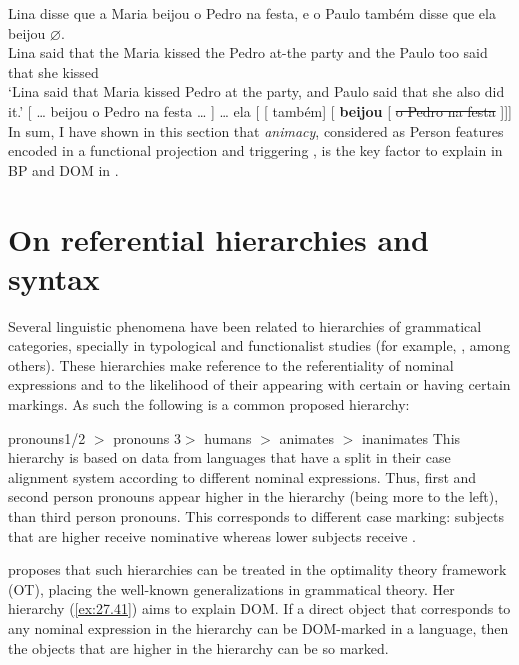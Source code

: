 \documentclass[output=paper]{langsci/langscibook}
\begin{document}
\ea\label{ex:27.39} 
    \ea
        \gll    Lina disse  que   a   Maria beijou   o Pedro na festa, e o Paulo também disse que ela  beijou \textbf{$\varnothing$}.\\
                Lina said    that the Maria kissed   the   Pedro   at-the   party and  the Paulo too       said   that  she kissed\\
        \glt    `Lina said that Maria kissed Pedro at the party, and Paulo said that she also did it.'
    \ex
        {}[ \dots{} beijou o Pedro na festa \dots{} ] \dots{} ela [ [ também] [\textbf{} \textbf{beijou} [ \sout{o Pedro na festa} ]]]\\
    \z
\z
In sum, I have shown in this section that \emph{animacy}, considered as Person
features encoded in a functional projection and triggering , is the key
factor to explain  in \gls{BP} and
DOM in .

\section{On referential hierarchies and syntax}\label{sec:27.4}

Several linguistic phenomena have been related to hierarchies of grammatical
categories, specially in typological and functionalist studies (for example,
\citealt{Silverstein1976}, among others). These hierarchies make reference to
the referentiality of nominal expressions and to the likelihood of their
appearing with certain  or having certain markings. As
such the following is a common proposed hierarchy:

\ea\label{ex:27.40}
    pronouns1/2 $>$ pronouns 3$>$ humans $>$ animates $>$ inanimates \citep{Silverstein1976}
\z
This hierarchy is based on data from languages that have a split in their case
alignment system according to different nominal expressions. Thus, first and
second person pronouns appear higher in the hierarchy (being more to the left),
than third person pronouns. This corresponds to different
case marking: subjects that are higher receive nominative
whereas lower subjects receive .

\textcite{Aissen1999,Aissen2003} proposes that such hierarchies can be treated
in the optimality theory framework (\gls{OT}), placing the
well-known generalizations in grammatical theory. Her hierarchy
(\ref{ex:27.41}) aims to explain DOM\@. If a direct object that corresponds
to any nominal expression in the hierarchy can be DOM-marked in a language,
then the objects that are higher in the hierarchy can be so marked.
\end{document}
